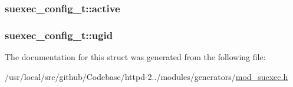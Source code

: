 \subsubsection[{\texorpdfstring{active}{active}}]{ suexec\+\_\+config\+\_\+t\+::active}\hypertarget{structsuexec__config__t_abebb10225763ef280587affeafb6f772}{}\label{structsuexec__config__t_abebb10225763ef280587affeafb6f772}
\subsubsection[{\texorpdfstring{ugid}{ugid}}]{ suexec\+\_\+config\+\_\+t\+::ugid}\hypertarget{structsuexec__config__t_a9ddf4ec024f3f32a3ec201677c5f70fe}{}\label{structsuexec__config__t_a9ddf4ec024f3f32a3ec201677c5f70fe}


The documentation for this struct was generated from the following file\+:\begin{DoxyCompactItemize}
\item 
/usr/local/src/github/\+Codebase/httpd-\/2../modules/generators/\hyperlink{mod__suexec_8h}{mod\+\_\+suexec.\+h}\end{DoxyCompactItemize}
